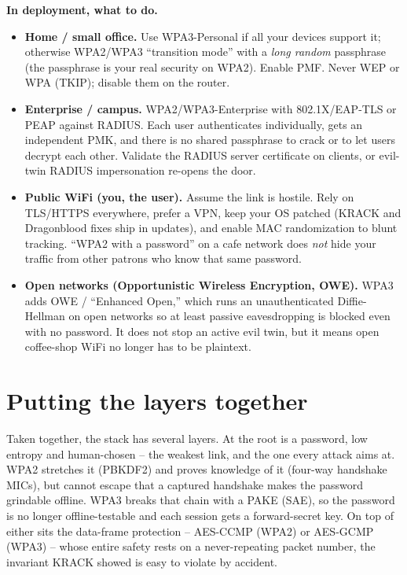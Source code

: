 \begin{applicationbox}
\textbf{In deployment, what to do.}
\begin{itemize}
  \item \textbf{Home / small office.} Use WPA3-Personal if all your devices
        support it; otherwise WPA2/WPA3 ``transition mode'' with a \emph{long
        random} passphrase (the passphrase is your real security on WPA2). Enable
        PMF. Never WEP or WPA (TKIP); disable them on the router.
  \item \textbf{Enterprise / campus.} WPA2/WPA3-Enterprise with 802.1X/EAP-TLS or
        PEAP against RADIUS. Each user authenticates individually, gets an
        independent PMK, and there is no shared passphrase to crack or to let
        users decrypt each other. Validate the RADIUS server certificate on
        clients, or evil-twin RADIUS impersonation re-opens the door.
  \item \textbf{Public WiFi (you, the user).} Assume the link is hostile. Rely on
        TLS/HTTPS everywhere, prefer a VPN, keep your OS patched (KRACK and
        Dragonblood fixes ship in updates), and enable MAC randomization to blunt
        tracking. ``WPA2 with a password'' on a cafe network does \emph{not} hide
        your traffic from other patrons who know that same password.
  \item \textbf{Open networks (Opportunistic Wireless Encryption, OWE).} WPA3
        adds OWE / ``Enhanced Open,'' which runs an unauthenticated Diffie-Hellman
        on open networks so at least passive eavesdropping is blocked even with no
        password. It does not stop an active evil twin, but it means open
        coffee-shop WiFi no longer has to be plaintext.
\end{itemize}
\end{applicationbox}

\section{Putting the layers together}

Taken together, the stack has several layers. At the root is a
password, low entropy and human-chosen -- the weakest link, and the one every
attack aims at. WPA2 stretches it (PBKDF2) and proves knowledge of it (four-way
handshake MICs), but cannot escape that a captured handshake makes the password
grindable offline. WPA3 breaks that chain with a PAKE (SAE), so the password is no
longer offline-testable and each session gets a forward-secret key. On top of
either sits the data-frame protection -- AES-CCMP (WPA2) or AES-GCMP (WPA3) --
whose entire safety rests on a never-repeating packet number, the invariant KRACK
showed is easy to violate by accident.


